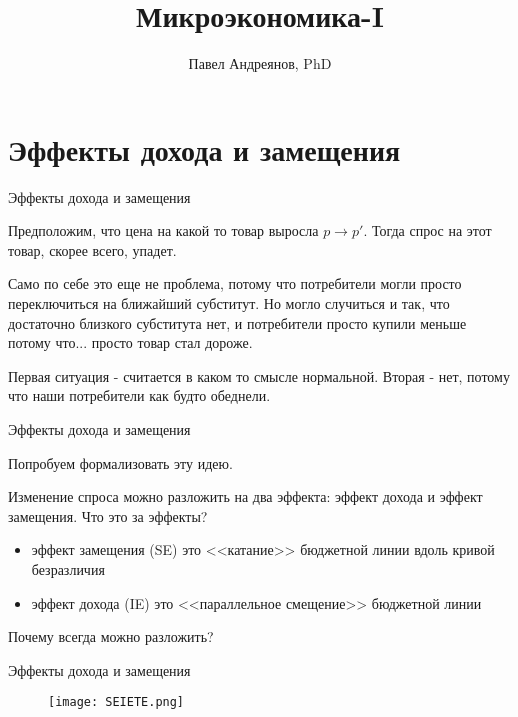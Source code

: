 \documentclass{beamer}
\title{
Микроэкономика-I
}
\author{
Павел Андреянов, PhD
}
\begin{document}
\maketitle

\section{Эффекты дохода и замещения}

\begin{frame}{Эффекты дохода и замещения}

Предположим, что цена на какой то товар выросла $p \to p'$. Тогда спрос на этот товар, скорее всего, упадет. 

Само по себе это еще не проблема, потому что потребители могли просто переключиться на ближайший субститут. Но могло случиться и так, что достаточно близкого субститута нет, и потребители просто купили меньше потому что... просто товар стал дороже. 

Первая ситуация - считается в каком то смысле нормальной. Вторая - нет, потому что наши потребители как будто обеднели.
\end{frame}


\begin{frame}{Эффекты дохода и замещения}

Попробуем формализовать эту идею. 

Изменение спроса можно разложить на два эффекта: эффект дохода и эффект замещения. Что это за эффекты?

\begin{itemize}
\item эффект замещения (SE) это <<катание>> бюджетной линии вдоль кривой безразличия
\item эффект дохода (IE) это <<параллельное смещение>> бюджетной линии
\end{itemize}

Почему всегда можно разложить? 

\end{frame}

\begin{frame}{Эффекты дохода и замещения}

\begin{figure}[hbt]
\centering
\texttt{[image: SEIETE.png]}
\end{figure}

\end{frame}
\end{document}
